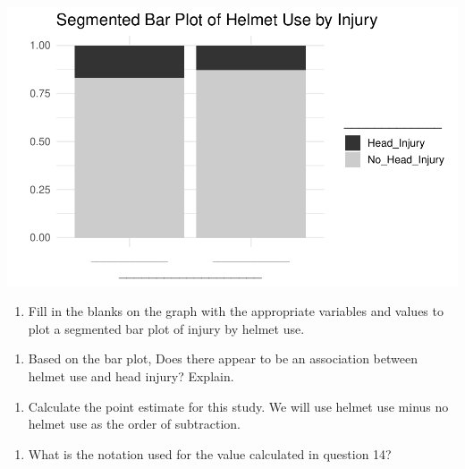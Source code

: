 \documentclass[
]{report}
\providecommand{\tightlist}{%
  \setlength{\itemsep}{0pt}\setlength{\parskip}{0pt}}
\begin{document}
\begin{center}\includegraphics[width=0.7\linewidth]{07-inference-2cat_files/figure-latex/unnamed-chunk-2-1} \end{center}

\begin{enumerate}
\def\labelenumi{\arabic{enumi}.}
\setcounter{enumi}{11}
\tightlist
\item
  Fill in the blanks on the graph with the appropriate variables and values to plot a segmented bar plot of injury by helmet use.
\end{enumerate}

\vspace{1in}

\begin{enumerate}
\def\labelenumi{\arabic{enumi}.}
\setcounter{enumi}{12}
\tightlist
\item
  Based on the bar plot, Does there appear to be an association between helmet use and head injury? Explain.
\end{enumerate}

\vspace{1in}

\begin{enumerate}
\def\labelenumi{\arabic{enumi}.}
\setcounter{enumi}{13}
\tightlist
\item
  Calculate the point estimate for this study. We will use helmet use minus no helmet use as the order of subtraction.
\end{enumerate}

\vspace{1in}

\begin{enumerate}
\def\labelenumi{\arabic{enumi}.}
\setcounter{enumi}{14}
\tightlist
\item
  What is the notation used for the value calculated in question 14?
\end{enumerate}

\vspace{0.5in}
\end{document}
